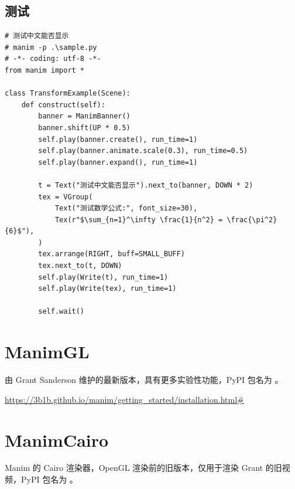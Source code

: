 \subsection{测试}
\begin{lstlisting}[style=pythonstyle]
# 测试中文能否显示
# manim -p .\sample.py 
# -*- coding: utf-8 -*-
from manim import *

class TransformExample(Scene):
    def construct(self):
        banner = ManimBanner()
        banner.shift(UP * 0.5)
        self.play(banner.create(), run_time=1)
        self.play(banner.animate.scale(0.3), run_time=0.5)
        self.play(banner.expand(), run_time=1)

        t = Text("测试中文能否显示").next_to(banner, DOWN * 2)
        tex = VGroup(
            Text("测试数学公式:", font_size=30),
            Tex(r"$\sum_{n=1}^\infty \frac{1}{n^2} = \frac{\pi^2}{6}$"),
        )
        tex.arrange(RIGHT, buff=SMALL_BUFF)
        tex.next_to(t, DOWN)
        self.play(Write(t), run_time=1)
        self.play(Write(tex), run_time=1)

        self.wait()
\end{lstlisting}

\section{ManimGL}
由 Grant Sanderson 维护的最新版本，具有更多实验性功能，PyPI 包名为 。

\url{https://3b1b.github.io/manim/getting_started/installation.html#}

\section{ManimCairo}
Manim 的 Cairo 渲染器，OpenGL 渲染前的旧版本，仅用于渲染 Grant 的旧视频，PyPI 包名为 。
